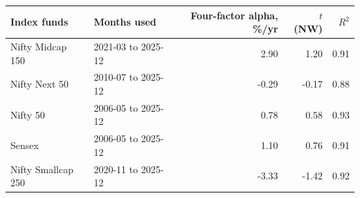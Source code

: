 \begin{tabular}{llrrr}
\toprule
Index funds & Months used & Four-factor alpha, \%/yr & $t$ (NW) & $R^2$ \\
\midrule
Nifty Midcap 150 & 2021-03 to 2025-12 & 2.90 & 1.20 & 0.91 \\
Nifty Next 50 & 2010-07 to 2025-12 & -0.29 & -0.17 & 0.88 \\
Nifty 50 & 2006-05 to 2025-12 & 0.78 & 0.58 & 0.93 \\
Sensex & 2006-05 to 2025-12 & 1.10 & 0.76 & 0.91 \\
Nifty Smallcap 250 & 2020-11 to 2025-12 & -3.33 & -1.42 & 0.92 \\
\bottomrule
\end{tabular}
